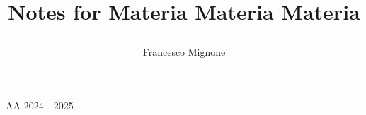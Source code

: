 \title{\bf Notes for Materia Materia Materia\par}
\author{Francesco Mignone}
\date{}
\begin{titlepage}

    \maketitle    

    \begin{center}
        AA 2024 - 2025
        \vfill
    \end{center}

\end{titlepage}
